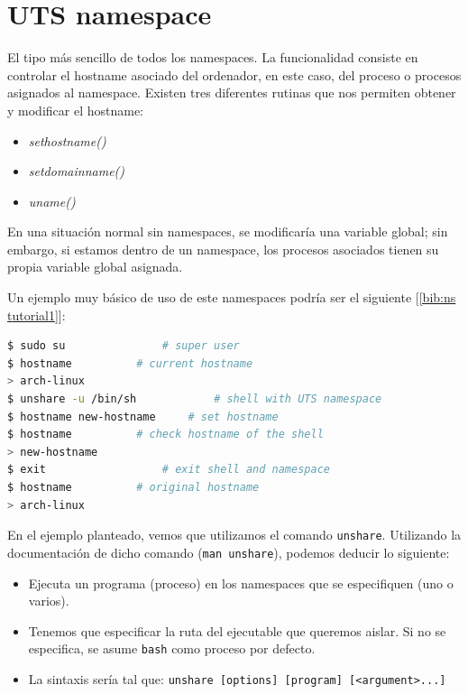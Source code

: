 \documentclass[a4paper, oneside, 12pt]{book}
\begin{document}
	\section{UTS namespace}
	\label{sect: uts namespace}
	\par \noindent El tipo más sencillo de todos los namespaces. La funcionalidad consiste en controlar el hostname asociado del ordenador, en este caso, del proceso o procesos asignados al namespace. Existen tres diferentes rutinas que nos permiten obtener y modificar el hostname: 
	\begin{itemize}
		\item \textit{sethostname()}
		\item \textit{setdomainname()}
		\item \textit{uname()}
	\end{itemize}
	En una situación normal sin namespaces, se modificaría una variable global; sin embargo, si estamos dentro de un namespace, los procesos asociados tienen su propia variable global asignada.\\
	
	\par \noindent Un ejemplo muy básico de uso de este namespaces podría ser el siguiente [\ref{bib:ns tutorial1}]:\\
	\begin{lstlisting}[language=bash, caption=Ejemplo de uso de UTS namespace]
$ sudo su				# super user
$ hostname			# current hostname
> arch-linux					
$ unshare -u /bin/sh			# shell with UTS namespace
$ hostname new-hostname		# set hostname
$ hostname			# check hostname of the shell
> new-hostname
$ exit					# exit shell and namespace
$ hostname			# original hostname
> arch-linux
	\end{lstlisting}

	\par \noindent En el ejemplo planteado, vemos que utilizamos el comando \texttt{unshare}. Utilizando la documentación de dicho comando (\texttt{man unshare}), podemos deducir lo siguiente:
	\begin{itemize}
		\item Ejecuta un programa (proceso) en los namespaces que se especifiquen (uno o varios).
		\item Tenemos que especificar la ruta del ejecutable que queremos aislar. Si no se especifica, se asume \texttt{bash} como proceso por defecto.
		\item La sintaxis sería tal que: \texttt{unshare [options] [program] [<argument>...]}
	\end{itemize}
\end{document}
